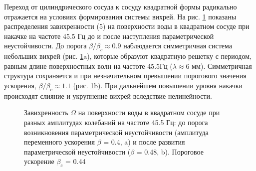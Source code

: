 Переход от цилиндрического сосуда к сосуду квадратной формы радикально отражается на условиях формирования системы вихрей. На рис. \ref{img:vort_square} показаны распределения завихренности (5) на поверхности воды в квадратном сосуде при накачке на частоте 45.5 Гц до и после наступления параметрической неустойчивости. До порога $\beta/\beta_c \approx 0.9$ наблюдается симметричная система небольших вихрей (рис. \ref{img:vort_square}a), которые образуют квадратную решетку с периодом, равным длине поверхностных волн на частоте 45.5Гц ($\lambda \approx 6$ мм). Симметричная структура сохраняется и при незначительном превышении порогового значения ускорения, $\beta/\beta_c \approx 1.1$ (рис. \ref{img:vort_square}b). При дальнейшем повышении уровня накачки происходят слияние и укрупнение вихрей вследствие нелинейности.

\begin{figure}[ht]
  \begin{minipage}[ht]{0.49\linewidth}
  \end{minipage}
  \hfill
  \begin{minipage}[ht]{0.49\linewidth}
  \end{minipage}
  \caption{Завихренность $\Omega$ на поверхности воды в квадратном сосуде при разных амплитудах колебаний на частоте 45.5 Гц: до порога возникновения параметрической неустойчивости (амплитуда переменного ускорения $\beta$ = 0.4, a) и после развития параметрической неустойчивости ($\beta$ = 0.48, b). Пороговое ускорение $\beta_c$ = 0.44}
  \label{img:vort_square}  
\end{figure}


